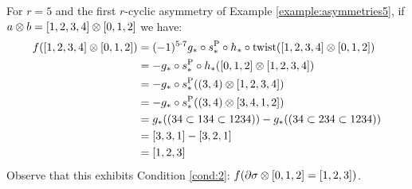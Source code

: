 \begin{example}\label{example:f5_2}
	For $r=5$ and the first $r$-cyclic asymmetry of Example \ref{example:asymmetries5}, if $a \otimes  b = [1,2,3,4] \otimes  [0,1,2]$ we have:
	\begin{align*}
		f([1,2,3,4] \otimes  [0,1,2])
		&= (-1)^{5\cdot 7}g_*\circ s_*^{\operatorname{P}}\circ h_*\circ \operatorname{twist}([1,2,3,4] \otimes  [0,1,2])
		\\
		&= -g_*\circ s_*^{\operatorname{P}}\circ h_*([0,1,2] \otimes  [1,2,3,4])
		\\
		&= -g_*\circ s_*^{\operatorname{P}}((3,4) \otimes  [1,2,3,4])
		\\
		&= -g_*\circ s_*^{\operatorname{P}}((3,4) \otimes  [3,4,1,2])
		\\
		&= g_*((34\subset 134\subset 1234)) - g_*((34\subset 234\subset 1234))
		\\
		&= [3,3,1] - [3,2,1]
		\\
		&= [1,2,3]
	\end{align*}
	Observe that this exhibits Condition \eqref{cond:2}: $f(\partial\sigma  \otimes  [0,1,2] = [1,2,3])$.
\end{example}

